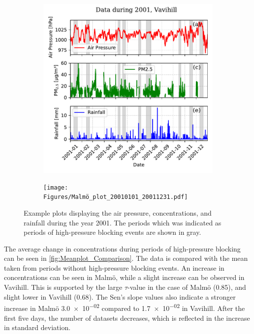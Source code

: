 \begin{figure}[H]
    \centering
    \begin{subfigure}[b]{0.49\textwidth}
        \centering
        \includegraphics[width=\textwidth]{Figures/Vavihill_plot_20010101_20011231.pdf}
        \label{fig:2001Vavihill}
    \end{subfigure}
    \hfill
    \begin{subfigure}[b]{0.49\textwidth}
        \centering
        \texttt{[image: Figures/Malmö\_plot\_20010101\_20011231.pdf]}
        \label{fig:2001Malmö}
    \end{subfigure}
    \caption{Example plots displaying the air pressure, \PM concentrations, and rainfall during the year 2001. The periods which was indicated as periods of high-pressure blocking events are shown in gray. }
    \label{fig:2001}
\end{figure}

The average change in \PM concentrations during periods of high-pressure blocking can be seen in \autoref{fig:Meanplot_Comparison}. The data is compared with the \PM mean taken from periods without high-pressure blocking events. An increase in \PM concentrations can be seen in Malmö, while a slight increase can be observed in Vavihill. This is supported by the large $\tau$-value in the case of Malmö (0.85), and slight lower in Vavihill (0.68). The Sen's slope values also indicate a stronger increase in Malmö \SI{3.0e-02}{} compared to \SI{1.7e-02}{} in Vavihill. After the first five days, the number of datasets decreases, which is reflected in the increase in standard deviation.


